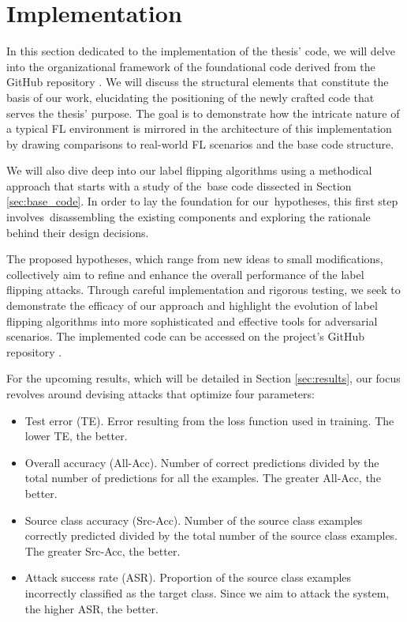 \section{Implementation}\label{sec:architecture}
In this section dedicated to the implementation of the thesis' code, we will delve into the organizational framework of the foundational code derived from the GitHub repository \cite{LFighter_code}. We will discuss the structural elements that constitute the basis of our work, elucidating the positioning of the newly crafted code that serves the thesis' purpose. The goal is to demonstrate how the intricate nature of a typical FL environment is mirrored in the architecture of this implementation by drawing comparisons to real-world FL scenarios and the base code structure.

We will also dive deep into our label flipping algorithms using a methodical approach that starts with a study of the base code dissected in Section \ref{sec:base_code}. In order to lay the foundation for our hypotheses, this first step involves disassembling the existing components and exploring the rationale behind their design decisions.

The proposed hypotheses, which range from new ideas to small modifications, collectively aim to refine and enhance the overall performance of the label flipping attacks. Through careful implementation and rigorous testing, we seek to demonstrate the efficacy of our approach and highlight the evolution of label flipping algorithms into more sophisticated and effective tools for adversarial scenarios. The implemented code can be accessed on the project's GitHub repository \cite{MastersThesisCode}.

For the upcoming results, which will be detailed in Section \ref{sec:results}, our focus revolves around devising attacks that optimize four parameters:
\begin{itemize}
        \item Test error (TE). Error resulting from the loss function used in training. The lower TE, the better.
        \item Overall accuracy (All-Acc). Number of correct predictions divided by the total number of predictions for all the examples. The greater All-Acc, the better.
        \item Source class accuracy (Src-Acc). Number of the source class examples correctly predicted divided by the total number of the source class examples. The greater Src-Acc, the better.
        \item Attack success rate (ASR). Proportion of the source class examples incorrectly classified as the target class. Since we aim to attack the system, the higher ASR, the better.
\end{itemize}


